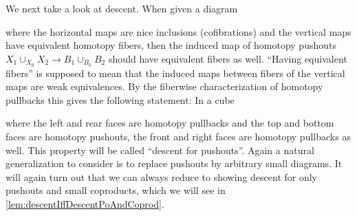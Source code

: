 We next take a look at descent.
When given a diagram 
\begin{center}
\end{center}
where the horizontal maps are nice inclusions (cofibrations) and the vertical maps have equivalent homotopy fibers, then the induced map of homotopy pushouts $X_1\cup_{X_{0}}X_2\to B_1\cup_{B_{0}}B_2$ should have equivalent fibers as well.
``Having equivalent fibers'' is supposed to mean that the induced maps between fibers of the vertical maps are weak equivalences.
By the fiberwise characterization of homotopy pullbacks this gives the following statement:
In a cube 
\begin{center}
\end{center}
where the left and rear faces are homotopy pullbacks and the top and bottom faces are homotopy pushouts, the front and right faces are homotopy pullbacks as well.
This property will be called ``descent for pushouts''.
Again a natural generalization to consider is to replace pushouts by arbitrary small diagrams.
It will again turn out that we can always reduce to showing descent for only pushouts and small coproducts, which we will see in \cref{lem:descentIffDescentPoAndCoprod}.